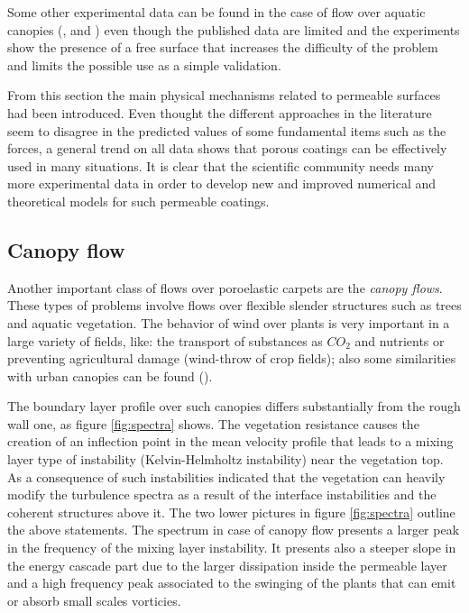 Some other experimental data can be found in the case of flow over aquatic canopies (\citet{zhang2011exchange}, \citet{segalini2011experimental} and \citet{hamed2017impact}) even though the published data are limited and the experiments show the presence of a free surface that increases the difficulty of the problem and limits the possible use as a simple validation.

From this section the main physical mechanisms related to permeable surfaces had been introduced.
Even thought the different approaches in the literature seem to disagree in the predicted values of some fundamental items such as the forces, a general trend on all  data shows that porous coatings can be effectively used in many situations.
It is clear that the scientific community needs many more experimental data in order to develop new and improved numerical and theoretical models for such permeable coatings.

\subsection{Canopy flow}

Another important class of flows over poroelastic carpets are the \textit{canopy flows}.
These types of problems involve flows over flexible slender structures such as trees and aquatic vegetation.
The behavior of wind over plants is very important in a large variety of fields, like: the transport of substances as $CO_2$ and nutrients or preventing agricultural damage (wind-throw of crop fields); also some similarities with urban canopies can be found (\citet{ghisalberti2009obstructed}).

The boundary layer profile over such canopies differs substantially from the rough wall one, as figure \ref{fig:spectra} shows.
The vegetation resistance causes the creation of an inflection point in the mean velocity profile that leads to a mixing layer type of instability (Kelvin-Helmholtz instability) near the vegetation top.
As a consequence of such instabilities \citet{finnigan2000turbulence} indicated that the vegetation can heavily modify the turbulence spectra as a result of the interface instabilities and the coherent structures above it.
The two lower pictures in figure \ref{fig:spectra} outline the above statements. The spectrum in case of canopy flow presents a larger peak in the frequency of the mixing layer instability. It presents also a steeper slope in the energy cascade part due to the larger dissipation inside the permeable layer and a high frequency peak associated to the swinging of the plants that can emit or absorb small scales vorticies.
 
